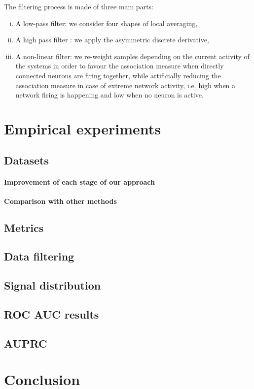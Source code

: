 \documentclass[wcp]{jmlr}
\begin{document}
The filtering process is made of three main parts:

\begin{enumerate}[i.]
\item A low-pass filter: we consider four shapes of local averaging, 
\item A high pass filter : we apply the asymmetric discrete derivative,
\item A non-linear filter: we re-weight samples depending on the current activity of the systems in order to favour the association measure when directly connected neurons are firing together, while artificially reducing the association measure in case of extreme network activity, i.e. high when a network firing is happening and low when no neuron is active.
\end{enumerate}

\section{Empirical experiments}
\subsection{Datasets}

\paragraph{Improvement of each stage of our approach\\}
\paragraph{Comparison with other methods\\}

\subsection{Metrics}
\subsection{Data filtering}
\subsection{Signal distribution}
\subsection{ROC AUC results}
\subsection{AUPRC}

\section{Conclusion}




\end{document}
